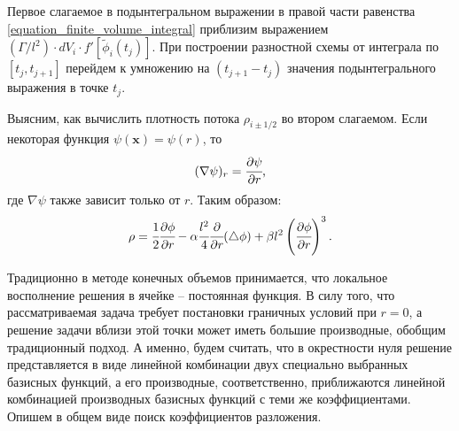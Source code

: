 \documentclass[a4paper,12pt]{article}
\theoremstyle{plain}
\theoremstyle{definition}
\begin{document}
Первое слагаемое в подынтегральном выражении в правой части равенства \eqref{equation_finite_volume_integral} приблизим выражением $(\Gamma/l^2) \cdot dV_i \cdot f'[\widetilde{\phi}_i(t_j)]$. При построении разностной схемы от интеграла по $[t_j, t_{j + 1}]$ перейдем к умножению на $(t_{j + 1} - t_j)$ значения подынтегрального выражения в точке $t_j$.

Выясним, как вычислить плотность потока $\rho_{i \pm 1/2}$ во втором слагаемом. Если некоторая функция $\psi(\mathbf{x}) = \psi(r)$, то
$$(\nabla \psi)_r = \cfrac{\partial \psi}{\partial r} \text{,}$$
где $\nabla \psi$ также зависит только от $r$. Таким образом:
\begin{equation}
    \rho = \cfrac{1}{2} \cfrac{\partial \phi}{\partial r} - \alpha \cfrac{l^2}{4} \cfrac{\partial}{\partial r} (\triangle \phi) + \beta l^2 \left( \cfrac{\partial \phi}{\partial r} \right)^3 \text{.}
    \label{equation_finite_volumes_density}
\end{equation}

Традиционно в методе конечных объемов принимается, что локальное восполнение решения в ячейке -- постоянная функция. В силу того, что рассматриваемая задача требует постановки граничных условий при $r = 0$, а решение задачи вблизи этой точки может иметь большие производные, обобщим традиционный подход. А именно, будем считать, что в окрестности нуля решение представляется в виде линейной комбинации двух специально выбранных базисных функций, а его производные, соответственно, приближаются линейной комбинацией производных базисных функций с теми же коэффициентами. Опишем в общем виде поиск коэффициентов разложения.
\end{document}
